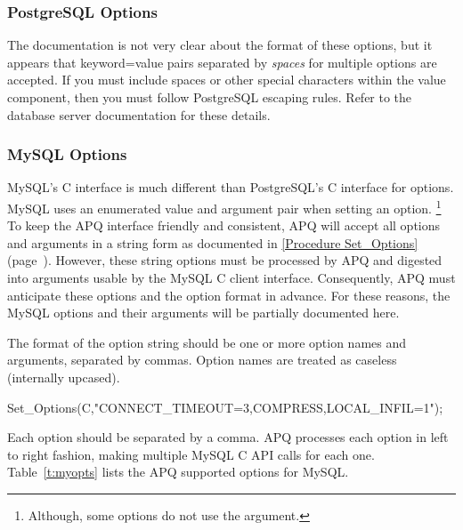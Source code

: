 \documentclass[english,letterpaper]{book}
\newcommand\Ref[1]{\textsection\ref{#1} (page~\pageref{#1})}
\begin{document}
\subsubsection{PostgreSQL Options}

The documentation is not very clear about the format of these options,
but it appears that keyword=value  pairs
separated by \emph{spaces} for multiple options are
accepted. If you must include spaces or other special characters within
the value component, then you must follow PostgreSQL escaping rules.
Refer to the database server documentation for these details.


\subsubsection{MySQL Options}

MySQL's C interface is much different than PostgreSQL's C interface
for options. MySQL uses an enumerated value and argument pair when
setting an option.%
\footnote{Although, some options do not use the argument.%
} To keep the APQ interface friendly and consistent, APQ will accept
all options and arguments in a string form as documented in
\Ref{Procedure Set_Options}. However, these string options must be
processed by APQ and digested into arguments usable by the MySQL C
client interface. Consequently, APQ must anticipate these options
and the option format in advance. For these reasons, the MySQL options
and their arguments will be partially documented here.

The format of the option string should be one or more option names
and arguments, separated by commas. Option names are treated as caseless
(internally upcased).

\begin{Example}

   Set\_Options(C,"CONNECT_TIMEOUT=3,COMPRESS,LOCAL_INFIL=1");

\end{Example}

Each option should be separated by a comma. APQ processes each option
in left to right fashion, making multiple MySQL C API calls for each
one. Table~\ref{t:myopts} lists the APQ supported options for MySQL.
\end{document}
